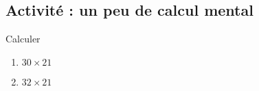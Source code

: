 
\subsection*{Activité : un peu de calcul mental}

Calculer
\begin{enumerate}
    \item
        \( 30\times 21\)
    \item
        \( 32\times 21\)
\end{enumerate}
